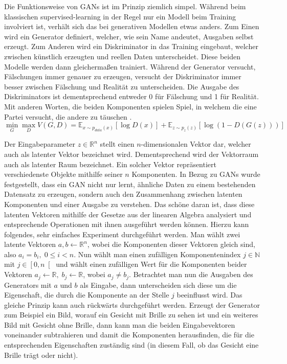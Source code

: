 Die Funktionsweise von GANs ist im Prinzip ziemlich simpel. Während beim
klassischen supervised-learning in der Regel nur ein Modell beim Training
involviert ist, verhält sich das bei generativen Modellen etwas anders. Zum
Einen wird ein Generator definiert, welcher, wie sein Name andeutet, Ausgaben
selbst erzeugt. Zum Anderen wird ein Diskriminator in das Training eingebaut,
welcher zwischen künstlich erzeugten und reellen Daten unterscheidet. Diese
beiden Modelle werden dann gleichermaßen trainiert. Während der Generator
versucht, Fälschungen immer genauer zu erzeugen, versucht der Diskriminator
immer besser zwischen Fälschung und Realität zu unterscheiden. Die
Ausgabe des Diskriminators ist dementsprechend entweder 0 für Fälschung und 1
für Realität. Mit anderen Worten, die beiden Komponenten spielen Spiel, in
welchem die eine Partei versucht, die andere zu täuschen
\cite{goodfellow2014generative}.
\[
\min_G \max_D V(G, D) = \mathbb{E}_{x \sim p_{data}(x)}\left[ \log D(x) \right] + \mathbb{E}_{z \sim p_z(z)}\left[ \log (1 - D(G(z))) \right]
\]

Der Eingabeparameter $z \in \mathbb{R}^n$ stellt einen $n$-dimensionalen Vektor
dar, welcher auch als latenter Vektor bezeichnet wird. Dementsprechend wird der
Vektorraum auch als latenter Raum bezeichnet. Ein solcher Vektor repräsentiert
verschiedenste Objekte mithilfe seiner $n$ Komponenten. In Bezug zu GANs wurde
festgestellt, dass ein GAN nicht nur lernt, ähnliche Daten zu einem bestehenden
Datensatz zu erzeugen, sondern auch den Zusammenhang zwischen latenten
Komponenten und einer Ausgabe zu verstehen. Das schöne daran ist, dass diese
latenten Vektoren mithilfe der Gesetze aus der linearen Algebra analysiert und
entsprechende Operationen mit ihnen ausgeführt werden können. Hierzu kann
folgendes, sehr einfaches Experiment durchgeführt werden. Man wählt zwei
latente Vektoren $a, b \leftarrow \mathbb{R}^n$, wobei die Komponenten dieser
Vektoren gleich sind, also $a_i = b_i, \; 0 \leq i < n$. Nun wählt man einen
zufälligen Komponentenindex $j \in \mathbb{N}$ mit $j \in \left[0, n\right[$
und wählt einen zufälligen Wert für die Komponenten beider Vektoren $a_j
\leftarrow \mathbb{R},\; b_j \leftarrow \mathbb{R}$, wobei $a_j \neq b_j$.
Betrachtet man nun die Ausgaben des Generators mit $a$ und $b$ als Eingabe,
dann unterscheiden sich diese um die Eigenschaft, die durch die Komponente an
der Stelle $j$ beeinflusst wird. Das gleiche Prinzip kann auch rückwärts
durchgeführt werden. Erzeugt der Generator zum Beispiel ein Bild, worauf ein
Gesicht mit Brille zu sehen ist und ein weiteres Bild mit Gesicht ohne
Brille, dann kann man die beiden Eingabevektoren voneinander subtrahieren und
damit die Komponenten herausfinden, die für die entsprechenden Eigenschaften
zuständig sind (in diesem Fall, ob das Gesicht eine Brille trägt oder nicht).

